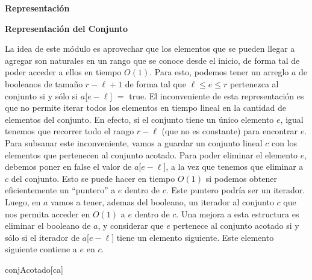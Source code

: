 \documentclass[a4paper,10pt]{article}
\newenvironment{Representacion}{%
  \vspace*{2ex}%
  \noindent\textbf{\Large Representación}%
  \vspace*{2ex}%
}{}
\newcommand{\Titulo}[1]{
  \vspace*{1ex}\par\noindent\textbf{\large #1}\par
}
\begin{document}
\begin{Representacion}

  \Titulo{Representación del Conjunto}
  
  La idea de este módulo es aprovechar que los elementos que se pueden llegar a agregar son naturales en un rango que se conoce desde el inicio, de forma tal de poder acceder a ellos en tiempo $O(1)$.  Para esto, podemos tener un arreglo $a$ de booleanos de tamaño $r - \ell + 1$ de forma tal que $\ell \leq e \leq r$ pertenezca al conjunto si y sólo si $a$[$e-\ell$] $=$ true.  El inconveniente de esta representación es que no permite iterar todos los elementos en tiempo lineal en la cantidad de elementos del conjunto.  En efecto, si el conjunto tiene un único elemento $e$, igual tenemos que recorrer todo el rango $r - \ell$ (que no es constante) para encontrar $e$.  Para subsanar este inconveniente, vamos a guardar un conjunto lineal $c$ con los elementos que pertenecen al conjunto acotado.  Para poder eliminar el elemento $e$, debemos poner en false el valor de $a$[$e-\ell$], a la vez que tenemos que eliminar a $c$ del conjunto.  Esto se puede hacer en tiempo $O(1)$ si podemos obtener eficientemente un ``puntero'' a $e$ dentro de $c$.  Este puntero podría ser un iterador.  Luego, en $a$ vamos a tener, ademas del booleano, un iterador al conjunto $c$ que nos permita acceder en $O(1)$ a $e$ dentro de $c$.  Una mejora a esta estructura es eliminar el booleano de $a$, y considerar que $e$ pertenece al conjunto acotado si y sólo si el iterador de $a$[$e - \ell$] tiene un elemento siguiente.  Este elemento siguiente contiene a $e$ en $c$.

  \begin{Estructura}{conjAcotado}[ca]
    \begin{Tupla}[ca]%
    \end{Tupla}
  \end{Estructura}

  \mbox{}


\end{Representacion}
\end{document}
